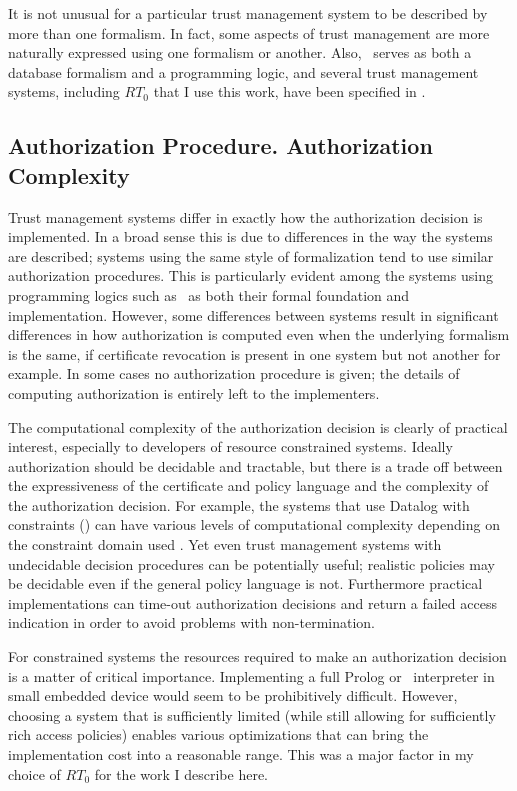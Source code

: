 It is not unusual for a particular trust management system to be described by more than one
formalism. In fact, some aspects of trust management are more naturally expressed using one
formalism or another. Also, \datalog\ serves as both a database formalism and a programming
logic, and several trust management systems, including $RT_0$ that I use this work, have been
specified in \datalog \cite{Li:DCFTML}.

\subsection{Authorization Procedure. Authorization Complexity}

Trust management systems differ in exactly how the authorization decision is implemented. In a
broad sense this is due to differences in the way the systems are described; systems using the
same style of formalization tend to use similar authorization procedures. This is particularly
evident among the systems using programming logics such as \datalog\ as both their formal
foundation and implementation. However, some differences between systems result in significant
differences in how authorization is computed even when the underlying formalism is the same, if
certificate revocation is present in one system but not another for example. In some cases no
authorization procedure is given; the details of computing authorization is entirely left to the
implementers.

The computational complexity of the authorization decision is clearly of practical interest,
especially to developers of resource constrained systems. Ideally authorization should be
decidable and tractable, but there is a trade off between the expressiveness of the certificate
and policy language and the complexity of the authorization decision. For example, the systems
that use Datalog with constraints (\datalogc) can have various levels of computational
complexity depending on the constraint domain used \cite{Li:DCFTML}. Yet even trust management
systems with undecidable decision procedures can be potentially useful; realistic policies may
be decidable even if the general policy language is not. Furthermore practical implementations
can time-out authorization decisions and return a failed access indication in order to avoid
problems with non-termination.

For constrained systems the resources required to make an authorization decision is a matter of
critical importance. Implementing a full Prolog or \datalogc\ interpreter in small embedded
device would seem to be prohibitively difficult. However, choosing a system that is sufficiently
limited (while still allowing for sufficiently rich access policies) enables various
optimizations that can bring the implementation cost into a reasonable range. This was a major
factor in my choice of $RT_0$ for the work I describe here.

